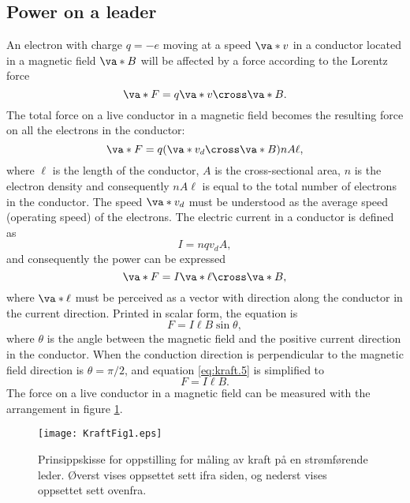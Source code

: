 \documentclass[../Elmag-labhefte-2020.tex]{subfiles}
\begin{document}
\subsection{Power on a leader \label{ch.kraft.beregn1}}
An electron with charge $q = -e$ moving at a speed $\va*{v}$ in a conductor located in a magnetic field $\va*{B}$ will be affected by a force according to the Lorentz force
\begin{equation}
    \va*{F} = q \va*{v} \cross \va*{B}.
\end{equation}
%
 The total force on a live conductor in a magnetic field becomes the resulting force on all the electrons in the conductor:
\begin{equation}
    \va*{F} = q (\va*{v}_d \cross \va*{B} ) n A \ell,
\end{equation}
%
where $\ell$ is the length of the conductor, $A$ is the cross-sectional area, $n$ is the electron density and consequently $n A \ell$ is equal to the total number of electrons in the conductor. The speed $\va*{v}_d$ must be understood as the average speed (operating speed) of the electrons.
The electric current in a conductor is defined as
\begin{equation}
    I = nqv_d A ,
\end{equation}
and consequently the power can be expressed
\begin{equation}
    \va*{F} = I\va*{\ell} \cross \va*{B},
\end{equation}
%
where $\va*{\ell}$ must be perceived as a vector with direction along the conductor in the current direction. Printed in scalar form, the equation is
\begin{equation}
    F = I\ell B \sin \theta,
    \label{eq:kraft.5}
\end{equation}
where $\theta$ is the angle between the magnetic field and the positive current direction in the conductor. When the conduction direction is perpendicular to the magnetic field direction is $\theta = \pi/2$, and equation \eqref{eq:kraft.5} is simplified to
\begin{equation}
    F = I\ell B.
    \label{eq:kraft.6}
\end{equation}
%
The force on a live conductor in a magnetic field can be measured with the arrangement in figure \ref{kraft.fig1}.
\begin{figure}[tbh]
\RawFloats
    \centering
    \texttt{[image: KraftFig1.eps]}
    \caption{%
        Prinsippskisse for oppstilling for måling av kraft på en strømførende leder. Øverst vises oppsettet sett ifra siden, og nederst vises oppsettet sett ovenfra.
    }
    \label{kraft.fig1}
\end{figure}
\end{document}
